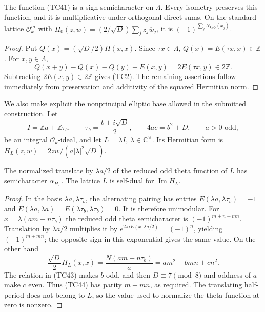 \begin{lemma}\label{tc-norm-semicharacter}
The function (TC41) is a sign semicharacter on $\Lambda$.
Every isometry preserves this function, and it is multiplicative
under orthogonal direct sums.
On the standard lattice $\mathcal O_k^m$ with
$H_0(z,w)=(2/\sqrt D)\sum_jz_j\overline w_j$, it is
$(-1)^{\sum_jN_{k/\mathbb Q}(x_j)}$.
\end{lemma}
\begin{proof}
Put $Q(x)=(\sqrt D/2)H(x,x)$.
Since $\tau x\in\Lambda$,
$Q(x)=E(\tau x,x)\in\mathbb Z$.
For $x,y\in\Lambda$,
\[
 Q(x+y)-Q(x)-Q(y)+E(x,y)=2E(\tau x,y)\in2\mathbb Z.
 \tag{TC42}
\]
Subtracting $2E(x,y)\in2\mathbb Z$ gives (TC2).
The remaining assertions follow immediately from preservation
and additivity of the squared Hermitian norm.
\end{proof}

We also make explicit the nonprincipal elliptic base allowed
in the submitted construction.
Let
\[
 I=\mathbb Za+\mathbb Z\tau_b,\qquad
 \tau_b=\frac{b+i\sqrt D}{2},\qquad
 4ac=b^2+D,\qquad a>0\text{ odd},
 \tag{TC43}
\]
be an integral $\mathcal O_k$-ideal, and let $L=\lambda I$,
$\lambda\in\mathbb C^\times$.
Its Hermitian form is
$H_L(z,w)=2z\overline w/(a|\lambda|^2\sqrt D)$.

\begin{lemma}\label{tc-ideal-character}
The normalized translate by $\lambda a/2$ of the reduced odd
theta function of $L$ has semicharacter $\alpha_{H_L}$.
The lattice $L$ is self-dual for $\operatorname{Im}H_L$.
\end{lemma}
\begin{proof}
In the basis $\lambda a,\lambda\tau_b$, the alternating
pairing has entries $E(\lambda a,\lambda\tau_b)=-1$ and
$E(\lambda a,\lambda a)=E(\lambda\tau_b,\lambda\tau_b)=0$.
It is therefore unimodular.
For $x=\lambda(am+n\tau_b)$ the reduced odd theta
semicharacter is $(-1)^{m+n+mn}$.
Translation by $\lambda a/2$ multiplies it by
$e^{2\pi iE(x,\lambda a/2)}=(-1)^n$, yielding
$(-1)^{m+mn}$; the opposite sign in this exponential
gives the same value.
On the other hand
\[
 \frac{\sqrt D}{2}H_L(x,x)
       =\frac{N(am+n\tau_b)}a
       =am^2+bmn+cn^2.
 \tag{TC44}
\]
The relation in (TC43) makes $b$ odd, and then
$D\equiv7\pmod8$ and oddness of $a$ make $c$ even.
Thus (TC44) has parity $m+mn$, as required.
The translating half-period does not belong to $L$, so the
value used to normalize the theta function at zero is nonzero.
\end{proof}

